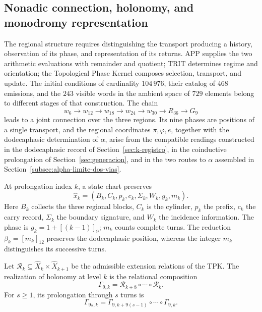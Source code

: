 \subsection{Nonadic connection, holonomy, and monodromy representation}
\label{mono-ampl:conexion}

The regional structure requires distinguishing the transport producing a
history, observation of its phase, and representation of its returns.
APP supplies the two arithmetic evaluations with remainder and quotient; TRIT
determines regime and orientation; the Topological Phase Kernel composes
selection, transport, and update. The initial conditions of
cardinality \(104\,976\), their catalog of \(468\) emissions, and the \(243\)
visible words in the ambient space of \(729\) elements belong to different
stages of that construction. The chain
\[
 w_6\longrightarrow w_{12}\longrightarrow w_{18}
 \longrightarrow w_{24}\longrightarrow w_{30}
 \longrightarrow R_{36}\longrightarrow G_9
\]
leads to a joint connection over the three regions. Its nine phases
are positions of a single transport, and the regional coordinates
\(\pi,\varphi,e\), together with the dodecaphasic determination of \(\alpha\),
arise from the compatible readings constructed in the dodecaphasic record
of Section~\ref{sec:k-registro}, in the coinductive prolongation of
Section~\ref{sec:generacion}, and in the two routes to \(\alpha\) assembled
in Section~\ref{subsec:alpha-limite-dos-vias}.

At prolongation index \(k\), a state chart preserves
\[
 \widehat x_k=(B_k,C_k,p_k,c_k,\Sigma_k,W_k,g_k,m_k).
\]
Here \(B_k\) collects the three regional blocks, \(C_k\) is the cylinder,
\(p_k\) the prefix, \(c_k\) the carry record, \(\Sigma_k\) the boundary
signature, and \(W_k\) the incidence information. The phase is
\(g_k=1+[(k-1)]_9\); \(m_k\) counts complete turns. The reduction
\(\beta_k=[m_k]_{12}\) preserves the dodecaphasic position, whereas the
integer \(m_k\) distinguishes its successive turns.

\begin{definition}
\label{mono-ampl:def-vuelta}
Let \(\mathcal R_k\subseteq\widehat X_k\times\widehat X_{k+1}\)
be the admissible extension relations of the TPK. The realization of
holonomy at level \(k\) is the relational composition
\[
 \Gamma_{9,k}=\mathcal R_{k+8}\circ\cdots\circ\mathcal R_k.
\]
For \(s\geq1\), its prolongation through \(s\) turns is
\[
 \Gamma_{9s,k}=
 \Gamma_{9,k+9(s-1)}\circ\cdots\circ\Gamma_{9,k}.
\]
\end{definition}

